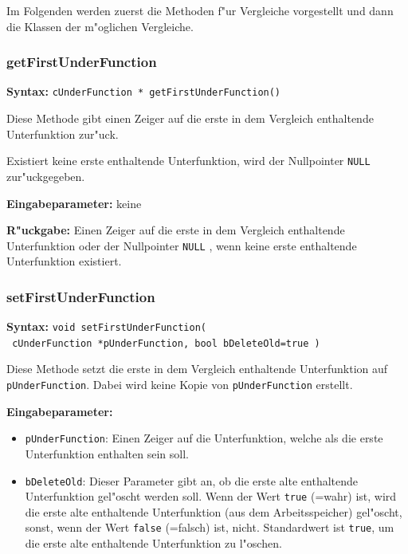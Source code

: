 Im Folgenden werden zuerst die Methoden f"ur Vergleiche vorgestellt und dann die Klassen der m"oglichen Vergleiche.



\subsubsection{getFirstUnderFunction}

\textbf{Syntax:} \verb|cUnderFunction * getFirstUnderFunction()|

\bigskip\noindent
Diese Methode gibt einen Zeiger auf die erste in dem Vergleich enthaltende Unterfunktion zur"uck.

Existiert keine erste enthaltende Unterfunktion, wird der Nullpointer \verb|NULL| zur"uckgegeben.

\bigskip\noindent
\textbf{Eingabeparameter:} keine

\bigskip\noindent
\textbf{R"uckgabe:} Einen Zeiger auf die erste in dem Vergleich enthaltende Unterfunktion oder der Nullpointer \verb|NULL| , wenn keine erste enthaltende Unterfunktion existiert.


\subsubsection{setFirstUnderFunction}

\textbf{Syntax:} \verb|void setFirstUnderFunction(| \\\verb| cUnderFunction *pUnderFunction, bool bDeleteOld=true )|

\bigskip\noindent
Diese Methode setzt die erste in dem Vergleich enthaltende Unterfunktion auf \verb|pUnderFunction|. Dabei wird keine Kopie von \verb|pUnderFunction| erstellt.

\bigskip\noindent
\textbf{Eingabeparameter:}
\begin{itemize}
 \item \verb|pUnderFunction|: Einen Zeiger auf die Unterfunktion, welche als die erste Unterfunktion enthalten sein soll.
 \item \verb|bDeleteOld|: Dieser Parameter gibt an, ob die erste alte enthaltende Unterfunktion gel"oscht werden soll. Wenn der Wert \verb|true| (=wahr) ist, wird die erste alte enthaltende Unterfunktion (aus dem Arbeitsspeicher) gel"oscht, sonst, wenn der Wert \verb|false| (=falsch) ist, nicht. Standardwert ist \verb|true|, um die erste alte enthaltende Unterfunktion zu l"oschen.
\end{itemize}

